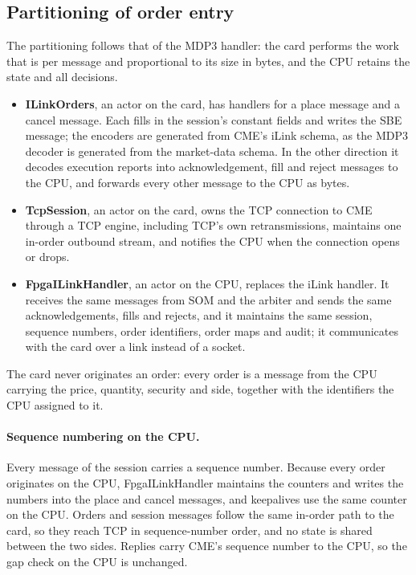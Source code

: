 \documentclass[11pt]{article}
\begin{document}
\subsection{Partitioning of order entry}

The partitioning follows that of the MDP3 handler: the card performs the work
that is per message and proportional to its size in bytes, and the CPU retains
the state and all decisions.

\begin{itemize}[leftmargin=1.4em]
  \item \textbf{ILinkOrders}, an actor on the card, has handlers for a place
  message and a cancel message. Each fills in the session's constant fields and
  writes the SBE message; the encoders are generated from CME's iLink schema,
  as the MDP3 decoder is generated from the market-data schema. In the other
  direction it decodes execution reports into acknowledgement, fill and reject
  messages to the CPU, and forwards every other message to the CPU as bytes.
  \item \textbf{TcpSession}, an actor on the card, owns the TCP connection to
  CME through a TCP engine, including TCP's own retransmissions, maintains one
  in-order outbound stream, and notifies the CPU when the connection opens or
  drops.
  \item \textbf{FpgaILinkHandler}, an actor on the CPU, replaces the iLink
  handler. It receives the same messages from SOM and the arbiter and sends the
  same acknowledgements, fills and rejects, and it maintains the same session,
  sequence numbers, order identifiers, order maps and audit; it communicates
  with the card over a link instead of a socket.
\end{itemize}

\noindent The card never originates an order: every order is a message from
the CPU carrying the price, quantity, security and side, together with the
identifiers the CPU assigned to it.

\paragraph{Sequence numbering on the CPU.} Every message of the session
carries a sequence number. Because every order originates on the CPU,
FpgaILinkHandler maintains the counters and writes the numbers into the place
and cancel messages, and keepalives use the same counter on the CPU. Orders and
session messages follow the same in-order path to the card, so they reach TCP
in sequence-number order, and no state is shared between the two sides.
Replies carry CME's sequence number to the CPU, so the gap check on the CPU is
unchanged.
\end{document}
